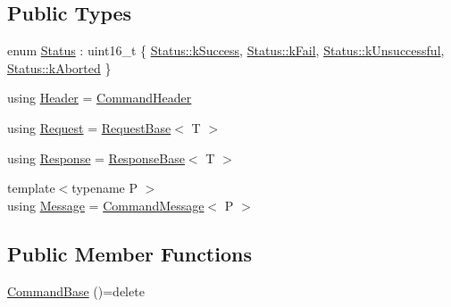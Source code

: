 \subsection*{Public Types}
\begin{DoxyCompactItemize}
\item 
enum \hyperlink{structresearch__interface_1_1gripper_1_1CommandBase_a1f3949079407002d1c0587723ab3af9a}{Status} \+: uint16\+\_\+t \{ \hyperlink{structresearch__interface_1_1gripper_1_1CommandBase_a1f3949079407002d1c0587723ab3af9aa8c632159fa131f09d04f94e3cbcd8782}{Status\+::k\+Success}, 
\hyperlink{structresearch__interface_1_1gripper_1_1CommandBase_a1f3949079407002d1c0587723ab3af9aa36f2a6ba7a5a19d5ab451e08bc7a7745}{Status\+::k\+Fail}, 
\hyperlink{structresearch__interface_1_1gripper_1_1CommandBase_a1f3949079407002d1c0587723ab3af9aae6e8372dfc6f07160d994a454ccb5013}{Status\+::k\+Unsuccessful}, 
\hyperlink{structresearch__interface_1_1gripper_1_1CommandBase_a1f3949079407002d1c0587723ab3af9aac20d0424ae4484fda4424713f021d736}{Status\+::k\+Aborted}
 \}
\item 
using \hyperlink{structresearch__interface_1_1gripper_1_1CommandBase_af98836db765ae091d4a49d2bda46a288}{Header} = \hyperlink{structresearch__interface_1_1gripper_1_1CommandHeader}{Command\+Header}
\item 
using \hyperlink{structresearch__interface_1_1gripper_1_1CommandBase_ad35751ab24cc9fe83798d890dff1484d}{Request} = \hyperlink{structresearch__interface_1_1gripper_1_1RequestBase}{Request\+Base}$<$ T $>$
\item 
using \hyperlink{structresearch__interface_1_1gripper_1_1CommandBase_a661eac13988213b2071372ddafc09a26}{Response} = \hyperlink{structresearch__interface_1_1gripper_1_1ResponseBase}{Response\+Base}$<$ T $>$
\item 
{\footnotesize template$<$typename P $>$ }\\using \hyperlink{structresearch__interface_1_1gripper_1_1CommandBase_a7d2de8bd0656d747f712a4a592750efc}{Message} = \hyperlink{structresearch__interface_1_1gripper_1_1CommandMessage}{Command\+Message}$<$ P $>$
\end{DoxyCompactItemize}
\subsection*{Public Member Functions}
\begin{DoxyCompactItemize}
\item 
\hyperlink{structresearch__interface_1_1gripper_1_1CommandBase_a0cce4e8ceb4d82276c45dcdfc2da18b4}{Command\+Base} ()=delete
\end{DoxyCompactItemize}
